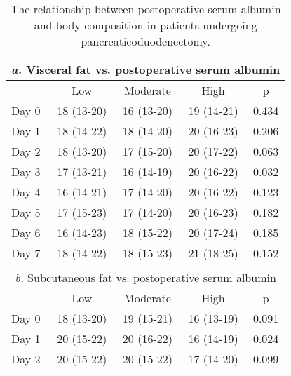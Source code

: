 \begin{table}[p]
	\caption{The relationship  between postoperative serum albumin and body composition in patients undergoing pancreaticoduodenectomy. }
	\label{table:sirs_bodycomp_alb}
	\centering
	\renewcommand{\arraystretch}{1.2} %
	\setlength{\tabcolsep}{9pt} %
	
	\begin{tabular}{|l c c c c |}
		        \multicolumn{5}{c}{\textit{a.} Visceral fat vs. postoperative serum albumin}         \\ \hline
		      & Low        & Moderate   & High       & p                                             \\
		Day 0 & 18 (13-20) & 16 (13-20) & 19 (14-21) & 0.434                                         \\
		Day 1 & 18 (14-22) & 18 (14-20) & 20 (16-23) & 0.206                                         \\
		Day 2 & 18 (13-20) & 17 (15-20) & 20 (17-22) & 0.063                                         \\
		Day 3 & 17 (13-21) & 16 (14-19) & 20 (16-22) & 0.032                                         \\
		Day 4 & 16 (14-21) & 17 (14-20) & 20 (16-22) & 0.123                                         \\
		Day 5 & 17 (15-23) & 17 (14-20) & 20 (16-23) & 0.182                                         \\
		Day 6 & 16 (14-23) & 18 (15-22) & 20 (17-24) & 0.185                                         \\
		Day 7 & 18 (14-22) & 18 (15-23) & 21 (18-25) & 0.152                                         \\ \hline
		                                    \multicolumn{5}{c}{}                                     \\
		      \multicolumn{5}{c}{\textit{b.} Subcutaneous fat vs. postoperative serum albumin}       \\ \hline
		      & Low        & Moderate   & High       & p                                             \\
		Day 0 & 18 (13-20) & 19 (15-21) & 16 (13-19) & 0.091                                         \\
		Day 1 & 20 (15-22) & 20 (16-22) & 16 (14-19) & 0.024                                         \\
		Day 2 & 20 (15-22) & 20 (15-22) & 17 (14-20) & 0.099                                         \\

\end{tabular}
\end{table}
